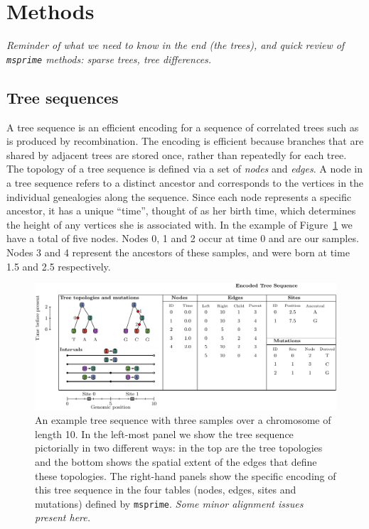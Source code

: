 \documentclass{article}
\newcommand{\msprime}{\texttt{msprime}}
\newcommand{\plr}[1]{{\em \color{blue} #1}}
\newcommand{\jk}[1]{{\em \color{red} #1}}
\begin{document}
\section*{Methods}

\plr{Reminder of what we need to know in the end (the trees), and
    quick review of \msprime{} methods: sparse trees, tree differences.}

\subsection*{Tree sequences}

A tree sequence is an efficient encoding for a sequence of correlated trees such as
is produced by recombination. The encoding is efficient because branches that are
shared by adjacent trees are stored once, rather than repeatedly for each tree.
The topology of a tree sequence is defined via a set of \emph{nodes} and
\emph{edges}. A node in a tree sequence refers to a distinct ancestor and
corresponds to the vertices in the individual genealogies along the sequence.
Since each node represents a specific ancestor, it has a unique ``time'',
thought of as her birth time, which determines the height of any vertices
she is associated with. In the example of Figure~\ref{fig:example_tree_sequence}
we have a total of five nodes. Nodes 0, 1 and 2 occur at time 0 and are our
samples. Nodes 3 and 4 represent the ancestors of these samples, and were born at
time 1.5 and 2.5 respectively.

\begin{figure}
    \begin{center}
        \includegraphics[width=\textwidth]{example_tree_sequence}
    \end{center}
    \caption{
        An example tree sequence with three samples over a chromosome of length 10. In the
        left-most panel we show the tree sequence pictorially in two different ways:
        in the top are the tree topologies and the bottom shows the spatial extent of the
        edges that define these topologies. The right-hand panels show the specific encoding
        of this tree sequence in the four tables (nodes, edges, sites and mutations) defined
        by \msprime.
        \jk{Some minor alignment issues present here.}
        \label{fig:example_tree_sequence}
    }
\end{figure}
\end{document}
